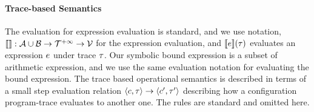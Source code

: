 \paragraph{Trace-based Semantics}
The evaluation for expression evaluation is standard, and 
we use notation, $\llbracket  \rrbracket : \mathcal{A} \cup \mathcal{B} \to \mathcal{T}^{+\infty} \to \mathcal{V}$ for the expression evaluation, and $\llbracket e \rrbracket(\mathtt{\tau})$ evaluates an expression $e$ under trace $\mathtt{\tau}$.
Our symbolic bound expression is a subset of arithmetic expression, and we use the same evaluation notation for evaluating the bound expression.
The trace based operational semantics is described in terms of a small step evaluation relation $\langle c, \mathtt{\tau} \rangle \to \langle c', \mathtt{\tau}' \rangle$ describing how a configuration program-trace evaluates to another
one.
The rules are standard and omitted here.
%
